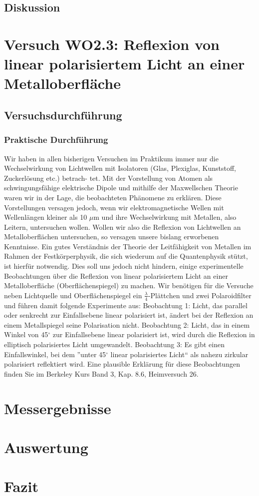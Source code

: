 \documentclass[12pt]{scrartcl}
\begin{document}
\subsection{Diskussion}

\section{Versuch WO2.3:
Reflexion von linear polarisiertem Licht an einer Metalloberfläche}
\subsection{Versuchsdurchführung}
\subsubsection{Praktische Durchführung}
Wir haben in allen bisherigen Versuchen im Praktikum immer nur die Wechselwirkung
von Lichtwellen mit Isolatoren (Glas, Plexiglas, Kunststoff, Zuckerlösung etc.) betrach-
tet. Mit der Vorstellung von Atomen als schwingungsfähige elektrische Dipole und mithilfe der Maxwellschen Theorie waren wir in der Lage, die beobachteten Phänomene zu erklären. Diese Vorstellungen versagen jedoch, wenn wir elektromagnetische Wellen mit Wellenlängen kleiner als 10 $\mu$m und ihre Wechselwirkung mit Metallen, also Leitern, untersuchen wollen. Wollen wir also die Reflexion von Lichtwellen an Metalloberflächen untersuchen, so versagen unsere bislang erworbenen Kenntnisse. Ein gutes Verständnis der Theorie der Leitfähigkeit von Metallen im Rahmen der Festkörperphysik, die sich wiederum auf die Quantenphysik stützt, ist hierfür notwendig. Dies soll uns jedoch nicht hindern, einige experimentelle Beobachtungen über die Reflexion von linear polarisiertem Licht an einer Metalloberfläche (Oberflächenspiegel) zu machen. Wir benötigen für die Versuche neben Lichtquelle und Oberflächenspiegel ein
$\frac{\lambda}{4}$-Plättchen und zwei Polaroidfilter und
führen damit folgende Experimente aus:
Beobachtung 1: Licht, das parallel oder senkrecht zur Einfallsebene linear polarisiert ist, ändert bei der Reflexion an einem Metallspiegel seine Polarisation nicht.
Beobachtung 2: Licht, das in einem Winkel von 45$^\circ$ zur Einfallsebene linear polarisiert ist, wird durch die Reflexion in elliptisch polarisiertes Licht umgewandelt.
Beobachtung 3: Es gibt einen Einfallswinkel, bei dem
”unter 45$^\circ$
linear polarisiertes
Licht“ als nahezu zirkular polarisiert reflektiert wird.
Eine plausible Erklärung für diese Beobachtungen finden Sie im Berkeley Kurs Band 3, Kap. 8.6, Heimversuch 26.

\section{Messergebnisse}


\section{Auswertung}


\section{Fazit}


\end{document}
